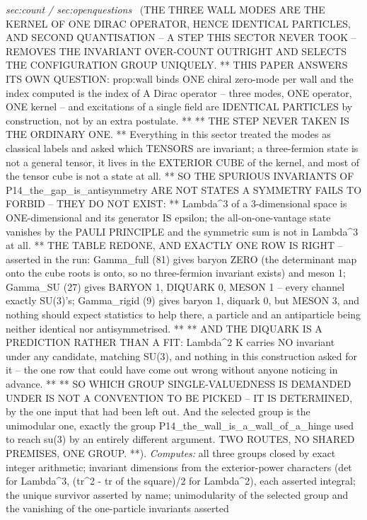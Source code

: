 \begin{description}
\textit{sec:count / sec:openquestions} \ (THE THREE WALL MODES ARE THE KERNEL OF ONE DIRAC OPERATOR, HENCE IDENTICAL PARTICLES, AND SECOND QUANTISATION -- A STEP THIS SECTOR NEVER TOOK -- REMOVES THE INVARIANT OVER-COUNT OUTRIGHT AND SELECTS THE CONFIGURATION GROUP UNIQUELY. ** THIS PAPER ANSWERS ITS OWN QUESTION: prop:wall binds ONE chiral zero-mode per wall and the index computed is the index of A Dirac operator -- three modes, ONE operator, ONE kernel -- and excitations of a single field are IDENTICAL PARTICLES by construction, not by an extra postulate. ** ** THE STEP NEVER TAKEN IS THE ORDINARY ONE. ** Everything in this sector treated the modes as classical labels and asked which TENSORS are invariant; a three-fermion state is not a general tensor, it lives in the EXTERIOR CUBE of the kernel, and most of the tensor cube is not a state at all. ** SO THE SPURIOUS INVARIANTS OF P14\_the\_gap\_is\_antisymmetry ARE NOT STATES A SYMMETRY FAILS TO FORBID -- THEY DO NOT EXIST: ** Lambda\textasciicircum{}3 of a 3-dimensional space is ONE-dimensional and its generator IS epsilon; the all-on-one-vantage state vanishes by the PAULI PRINCIPLE and the symmetric sum is not in Lambda\textasciicircum{}3 at all. ** THE TABLE REDONE, AND EXACTLY ONE ROW IS RIGHT -- asserted in the run: Gamma\_full (81) gives baryon ZERO (the determinant map onto the cube roots is onto, so no three-fermion invariant exists) and meson 1; Gamma\_SU (27) gives BARYON 1, DIQUARK 0, MESON 1 -- every channel exactly SU(3)'s; Gamma\_rigid (9) gives baryon 1, diquark 0, but MESON 3, and nothing should expect statistics to help there, a particle and an antiparticle being neither identical nor antisymmetrised. ** ** AND THE DIQUARK IS A PREDICTION RATHER THAN A FIT: Lambda\textasciicircum{}2 K carries NO invariant under any candidate, matching SU(3), and nothing in this construction asked for it -- the one row that could have come out wrong without anyone noticing in advance. ** ** SO WHICH GROUP SINGLE-VALUEDNESS IS DEMANDED UNDER IS NOT A CONVENTION TO BE PICKED -- IT IS DETERMINED, by the one input that had been left out. And the selected group is the unimodular one, exactly the group P14\_the\_wall\_is\_a\_wall\_of\_a\_hinge used to reach su(3) by an entirely different argument. TWO ROUTES, NO SHARED PREMISES, ONE GROUP. **). 
\emph{Computes:} all three groups closed by exact integer arithmetic; invariant dimensions from the exterior-power characters (det for Lambda\textasciicircum{}3, (tr\textasciicircum{}2 - tr of the square)/2 for Lambda\textasciicircum{}2), each asserted integral; the unique survivor asserted by name; unimodularity of the selected group and the vanishing of the one-particle invariants asserted

\end{description}
